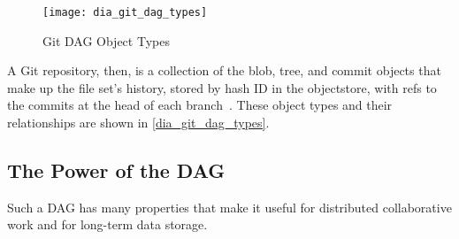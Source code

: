 \begin{figure}[p]
    \centering
        \texttt{[image: dia\_git\_dag\_types]}
    \caption{Git DAG Object Types}
    \label{dia_git_dag_types}
\end{figure}

A Git \gls{repository}, then, is a collection of the \gls{blob}, \gls{tree}, and
\gls{commit} objects that make up the file set's history, stored by hash ID in
the \gls{objectstore}, with \glspl{ref} to the \glspl{commit} at the \gls{head}
of each \gls{branch}~\cite{git_initial_readme}. These object types and their
relationships are shown in \autoref{dia_git_dag_types}.

%

\subsection{The Power of the DAG}

Such a \gls{DAG} has many properties that make it useful for distributed
collaborative work and for long-term data storage.


